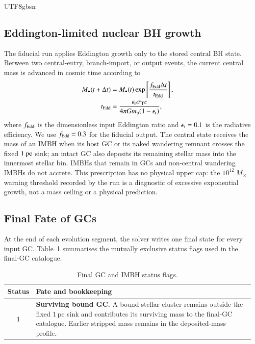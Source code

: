 \documentclass[trackchanges, twocolappendix, twocolumn]{aastex701}
\begin{document}
\begin{CJK*}{UTF8}{gbsn}
\subsection{Eddington-limited nuclear BH growth} \label{subsect:Eddington}

The fiducial run applies Eddington growth only to the stored central BH state. Between two central-entry, branch-import, or output events, the current central mass is advanced in cosmic time according to
\begin{align}
M_\bullet(t + \Delta t) & = M_\bullet(t) \exp\left[\dfrac{f_{\rm Edd}\Delta t}{t_{\rm Edd}}\right], \\
t_{\rm Edd} & = \dfrac{\epsilon_{\rm r}\sigma_{\rm T}c}{4\pi G m_{\rm p}(1 - \epsilon_{\rm r})},
\label{eq:eddington_growth}
\end{align}
where $f_{\rm Edd}$ is the dimensionless input Eddington ratio and $\epsilon_{\rm r}=0.1$ is the radiative efficiency. We use $f_{\rm Edd}=0.3$ for the fiducial output. The central state receives the mass of an IMBH when its host GC or its naked wandering remnant crosses the fixed $1~{\rm pc}$ sink; an intact GC also deposits its remaining stellar mass into the innermost stellar bin. IMBHs that remain in GCs and non-central wandering IMBHs do not accrete. This prescription has no physical upper cap: the $10^{12}~M_\odot$ warning threshold recorded by the run is a diagnostic of excessive exponential growth, not a mass ceiling or a physical prediction.

\subsection{Final Fate of GCs} \label{subsect:stat}

At the end of each evolution segment, the solver writes one final state for every input GC\@. Table~\ref{tab:final_status} summarises the mutually exclusive status flags used in the final-GC catalogue.

\begin{table}[!t]
\centering
\small
\caption{Final GC and IMBH status flags.}
\label{tab:final_status}

\begin{tabular}{cl}
\hline
\textbf{Status} & \textbf{Fate and bookkeeping} \\
\hline

$1$ &
\parbox[t]{0.84\textwidth}{\textbf{Surviving bound GC.}
A bound stellar cluster remains outside the fixed $1~\mathrm{pc}$ sink and
contributes its surviving mass to the final-GC catalogue. Earlier stripped
mass remains in the deposited-mass profile.} \\[6pt]


\end{tabular}
\end{table}
\end{CJK*}
\end{document}
